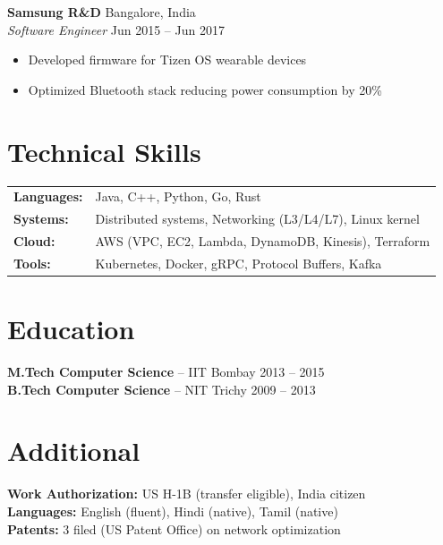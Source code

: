 \documentclass[10pt,letterpaper]{article}
\begin{document}
\textbf{Samsung R\&D} \hfill Bangalore, India\\
\textit{Software Engineer} \hfill Jun 2015 -- Jun 2017
\begin{itemize}
\item Developed firmware for Tizen OS wearable devices
\item Optimized Bluetooth stack reducing power consumption by 20\%
\end{itemize}

\section{Technical Skills}
\begin{tabularx}{\linewidth}{@{}lX@{}}
\textbf{Languages:} & Java, C++, Python, Go, Rust\\
\textbf{Systems:} & Distributed systems, Networking (L3/L4/L7), Linux kernel\\
\textbf{Cloud:} & AWS (VPC, EC2, Lambda, DynamoDB, Kinesis), Terraform\\
\textbf{Tools:} & Kubernetes, Docker, gRPC, Protocol Buffers, Kafka\\
\end{tabularx}

\section{Education}
\textbf{M.Tech Computer Science} -- IIT Bombay \hfill 2013 -- 2015\\
\textbf{B.Tech Computer Science} -- NIT Trichy \hfill 2009 -- 2013

\section{Additional}
\textbf{Work Authorization:} US H-1B (transfer eligible), India citizen\\
\textbf{Languages:} English (fluent), Hindi (native), Tamil (native)\\
\textbf{Patents:} 3 filed (US Patent Office) on network optimization
\end{document}
